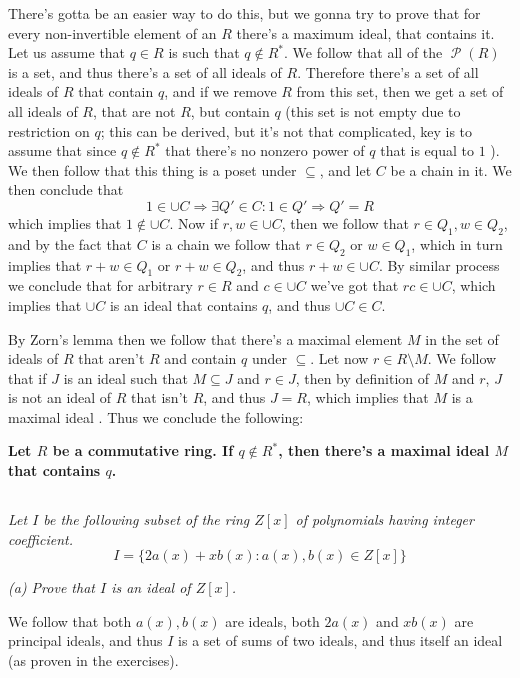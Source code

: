 \documentclass[11pt,oneside,titlepage]{book}
\DeclareMathOperator \pow {\mathcal {P}}
\DeclareMathOperator \ra {\Rightarrow}
\newcommand{\set}[1]{\{ #1 \}}
\begin{document}
There's gotta be an easier way to do this, but we gonna try to prove
that for every non-invertible element of an $R$ there's a maximum
ideal, that contains it. Let us assume that $q \in R$ is such that
$q \notin R^*$. We follow that all of the $\pow(R)$ is a set, and thus
there's a set of all ideals of $R$. Therefore there's a set of all
ideals of $R$ that contain $q$, and if we remove $R$ from this set,
then we get a set of all ideals of $R$, that are not $R$, but contain
$q$ (this set is not empty due to restriction on $q$; this can be
derived, but it's not that complicated, key is to assume that since
$q \notin R^*$ that there's no nonzero power of $q$ that is equal to
$1$ ). We then follow that this thing is a poset under $\subseteq$,
and let $C$ be a chain in it. We then conclude that
$$1 \in \cup C \ra \exists Q' \in C: 1 \in Q' \ra Q' = R$$
which implies that $1 \notin \cup C$. Now if $r, w \in \cup C$,
then we follow that $r \in Q_1, w \in Q_2$, and by the
fact that $C$ is a chain we follow that $r \in Q_2$ or $w \in Q_1$,
which in turn implies that $r + w \in Q_1$ or $r + w \in Q_2$,
and thus $r + w \in \cup C$. By similar process we conclude that for
arbitrary $r \in R$ and $c \in \cup C$ we've got that $rc \in \cup C$,
which implies that $\cup C$ is an ideal that contains $q$, and thus
$\cup C \in C$.

By Zorn's lemma then we follow that there's a maximal element $M$ in
the set of ideals of $R$ that aren't $R$ and contain $q$ under
$\subseteq$. Let now $r \in R \setminus M$. We follow that if $J$ is
an ideal such that $M \subseteq J$ and $r \in J$, then by definition
of $M$ and $r$, $J$ is not an ideal of $R$ that isn't $R$, and thus $J
= R$, which implies that $M$ is a maximal ideal . Thus we conclude the
following:

\textbf{Let $R$ be a commutative ring. If $q \notin R^*$, then there's
a maximal ideal $M$ that contains $q$.}


\subsection{}

\textit{Let $I$ be the following subset of the ring $Z[x]$ of
  polynomials having integer coefficient.
  $$I = \set{2a(x) + x b(x) : a(x), b(x) \in Z[x]}$$ 
}

\textit{(a) Prove that $I$ is an ideal of $Z[x]$.}

We follow that both $a(x), b(x)$ are ideals, both $2 a(x)$ and $x
b(x)$ are principal ideals, and thus $I$ is a set of sums of two ideals,
and thus itself  an ideal (as proven in the exercises).
\end{document}
